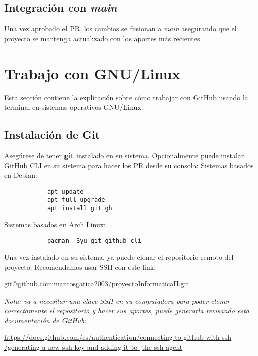 \documentclass[a4paper]{article}
\begin{document}
    \subsection{Integración con \textit{main}}
        Una vez aprobado el PR, los cambios se fusionan a \textit{main} asegurando que el proyecto se mantenga actualizado con los aportes más recientes.
        
\section{Trabajo con GNU/Linux}
\indent Esta sección contiene la explicación sobre cómo trabajar con GitHub usando la terminal en sistemas operativos GNU/Linux.
\subsection{Instalación de Git}
    Asegúrese de tener \textbf{git} instalado en su sistema. Opcionalmente puede instalar GitHub CLI en su sistema para hacer los PR desde su consola:
    \newline
    Sistemas basados en Debian:
    \begin{center}
        \begin{verbatim}
            apt update 
            apt full-upgrade 
            apt install git gh 
        \end{verbatim}
    \end{center}
    Sistemas basados en Arch Linux:
    \begin{center}
        \begin{verbatim}
            pacman -Syu git github-cli
        \end{verbatim}
    \end{center}
\thispagestyle{fancy}
\indent Una vez instalado en su sistema, ya puede clonar el repositorio remoto del proyecto. Recomendamos usar SSH con este link: \\
\begin{minipage}[c]{8cm}
    \centering
    \url{git@github.com:marcosgatica2003/proyectoInformaticaII.git}
\end{minipage}

\textit{Nota: va a necesitar una clave SSH en su computadora para poder clonar correctamente el repositorio y hacer sus aportes, puede generarla revisando esta documentación de GitHub:}

\begin{minipage}[r]{10cm}
    \url{https://docs.github.com/es/authentication/connecting-to-github-with-ssh}
    \url{/generating-a-new-ssh-key-and-adding-it-to-}
    \url{the-ssh-agent}
\end{minipage}
\end{document}
